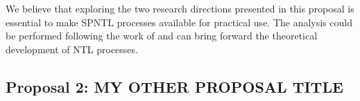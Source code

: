 We believe that exploring the two research directions presented in this proposal is essential to make SPNTL processes available for practical use. The analysis could be performed following the work of \cite{james2006poisson} and can bring forward the theoretical development of NTL processes.




\subsection{Proposal 2: MY OTHER PROPOSAL TITLE} %

